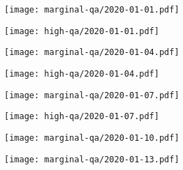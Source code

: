 \documentclass{article}
\begin{document}
\begin{figure}[H]
	\ContinuedFloat
	\centering
	\begin{subfigure}{0.48\linewidth}
		\texttt{[image: marginal-qa/2020-01-01.pdf]}
	\end{subfigure}
	\begin{subfigure}{0.48\linewidth}
		\texttt{[image: high-qa/2020-01-01.pdf]}
	\end{subfigure}
	\begin{subfigure}{0.48\linewidth}
		\texttt{[image: marginal-qa/2020-01-04.pdf]}
	\end{subfigure}
	\begin{subfigure}{0.48\linewidth}
		\texttt{[image: high-qa/2020-01-04.pdf]}
	\end{subfigure}
	\begin{subfigure}{0.48\linewidth}
		\texttt{[image: marginal-qa/2020-01-07.pdf]}
	\end{subfigure}
	\begin{subfigure}{0.48\linewidth}
		\texttt{[image: high-qa/2020-01-07.pdf]}
	\end{subfigure}
	\begin{subfigure}{\linewidth}
		\hspace{0.25cm}
		\texttt{[image: marginal-qa/2020-01-10.pdf]}
	\end{subfigure}
	\begin{subfigure}{\linewidth}
		\hspace{0.25cm}
		\texttt{[image: marginal-qa/2020-01-13.pdf]}
	\end{subfigure}
\end{figure}
\end{document}
